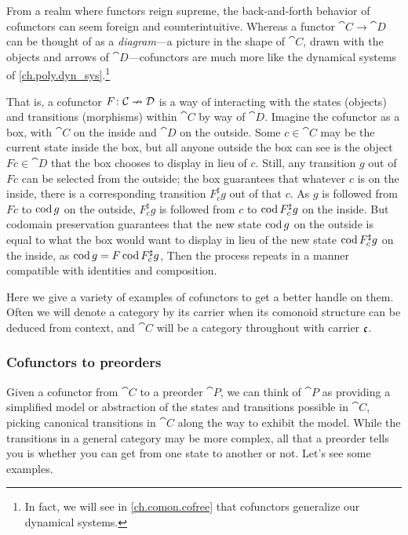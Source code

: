 \documentclass[Book-Poly]{subfiles}
\begin{document}
From a realm where functors reign supreme, the back-and-forth behavior of cofunctors can seem foreign and  counterintuitive.
Whereas a functor $\cat{C}\to\cat{D}$ can be thought of as a \emph{diagram}---a picture in the shape of $\cat{C}$, drawn with the objects and arrows of $\cat{D}$---cofunctors are much more like the dynamical systems of \cref{ch.poly.dyn_sys}.\footnote{In fact, we will see in \cref{ch.comon.cofree} that cofunctors generalize our dynamical systems.}

That is, a cofunctor $F\colon\mathcal{C}\nrightarrow\mathcal{D}$ is a way of interacting with the states (objects) and transitions (morphisms) within $\cat{C}$ by way of $\cat{D}$.
Imagine the cofunctor as a box, with $\cat{C}$ on the inside and $\cat{D}$ on the outside.
Some $c\in\cat{C}$ may be the current state inside the box, but all anyone outside the box can see is the object $Fc\in\cat{D}$ that the box chooses to display in lieu of $c$.
Still, any transition $g$ out of $Fc$ can be selected from the outside; the box guarantees that whatever $c$ is on the inside, there is a corresponding transition $F^\sharp_c g$ out of that $c$.
As $g$ is followed from $Fc$ to $\operatorname{cod} g$ on the outside, $F^\sharp_c g$ is followed from $c$ to $\operatorname{cod} F^\sharp_c g$ on the inside.
But codomain preservation guarantees that the new state $\operatorname{cod} g$ on the outside is equal to what the box would want to display in lieu of the new state $\operatorname{cod} F^\sharp_c g$ on the inside, as $\operatorname{cod} g=F\operatorname{cod} F^\sharp_c g$,
Then the process repeats in a manner compatible with identities and composition.

Here we give a variety of examples of cofunctors to get a better handle on them.
Often we will denote a category by its carrier when its comonoid structure can be deduced from context, and $\cat{C}$ will be a category throughout with carrier $\mathfrak{c}$.

\subsubsection{Cofunctors to preorders}

Given a cofunctor from $\cat{C}$ to a preorder $\cat{P}$, we can think of $\cat{P}$ as providing a simplified model or abstraction of the states and transitions possible in $\cat{C}$, picking canonical transitions in $\cat{C}$ along the way to exhibit the model.
While the transitions in a general category may be more complex, all that a preorder tells you is whether you can get from one state to another or not.
Let's see some examples.
\end{document}

